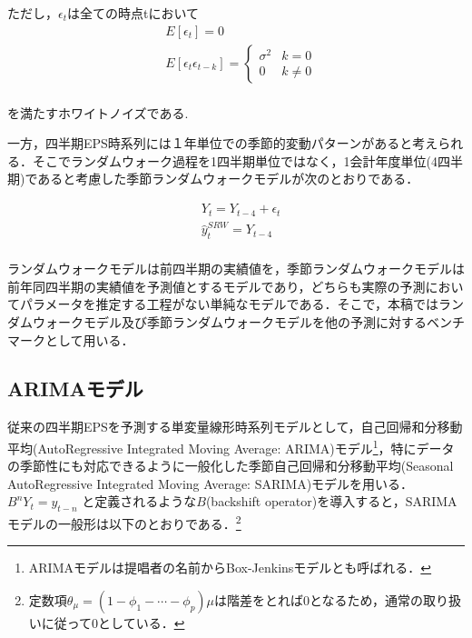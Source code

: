 \documentclass[a4paper，12pt]{jsarticle}
\begin{document}
ただし，$\epsilon_t$は全ての時点tにおいて
\begin{equation}
  \begin{split}
    & E[\epsilon_t] = 0 \\
    & E[\epsilon_t \epsilon_{t-k}] = \left\{
      \begin{array}{ll}
        \sigma^2 & k=0 \\
        0 & k \neq 0
      \end{array}\right.\\
  \end{split}
\end{equation}    

を満たすホワイトノイズである.

一方，四半期EPS時系列には１年単位での季節的変動パターンがあると考えられる．そこでランダムウォーク過程を1四半期単位ではなく，1会計年度単位(4四半期)であると考慮した季節ランダムウォークモデルが次のとおりである．

\begin{equation}
  \begin{split}
    & Y_t = Y_{t-4} + \epsilon_t \\
    & \hat{y}_t^{SRW} = Y_{t-4} \\
  \end{split}
\end{equation} 

ランダムウォークモデルは前四半期の実績値を，季節ランダムウォークモデルは前年同四半期の実績値を予測値とするモデルであり，どちらも実際の予測においてパラメータを推定する工程がない単純なモデルである．そこで，本稿ではランダムウォークモデル及び季節ランダムウォークモデルを他の予測に対するベンチマークとして用いる．

\subsection{ARIMAモデル}

従来の四半期EPSを予測する単変量線形時系列モデルとして，自己回帰和分移動平均(AutoRegressive Integrated Moving Average: ARIMA)モデル\citep{box2015time}\footnote{ARIMAモデルは提唱者の名前からBox-Jenkinsモデルとも呼ばれる．}，特にデータの季節性にも対応できるように一般化した季節自己回帰和分移動平均(Seasonal AutoRegressive Integrated Moving Average: SARIMA)モデルを用いる．$B^nY_t = y_{t-n}$ と定義されるような$B$(backshift operator)を導入すると，SARIMAモデルの一般形は以下のとおりである．\footnote{定数項$\theta_{\mu}=(1-\phi_1-\cdots-\phi_p)\mu$は階差をとれば0となるため，通常の取り扱いに従って0としている．}
\end{document}
